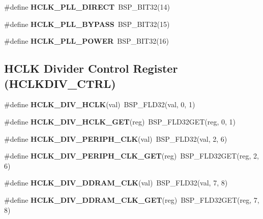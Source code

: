 \begin{DoxyCompactItemize}
\item 
\mbox{\label{group__lpc32xx__reg_ga9043291ff994770a7117844a3f10c4bd}} 
\#define {\bfseries H\+C\+L\+K\+\_\+\+P\+L\+L\+\_\+\+D\+I\+R\+E\+CT}~B\+S\+P\+\_\+\+B\+I\+T32(14)
\item 
\mbox{\label{group__lpc32xx__reg_ga78651bfed9ef9b15358fd20efc82333a}} 
\#define {\bfseries H\+C\+L\+K\+\_\+\+P\+L\+L\+\_\+\+B\+Y\+P\+A\+SS}~B\+S\+P\+\_\+\+B\+I\+T32(15)
\item 
\mbox{\label{group__lpc32xx__reg_ga4a435fd9889c1ff93fb42298be54f580}} 
\#define {\bfseries H\+C\+L\+K\+\_\+\+P\+L\+L\+\_\+\+P\+O\+W\+ER}~B\+S\+P\+\_\+\+B\+I\+T32(16)
\end{DoxyCompactItemize}
\subsection*{H\+C\+LK Divider Control Register (H\+C\+L\+K\+D\+I\+V\+\_\+\+C\+T\+RL)}
\begin{DoxyCompactItemize}
\item 
\mbox{\label{group__lpc32xx__reg_ga46664eafe2035b3fb7b5f1f2f5572d5d}} 
\#define {\bfseries H\+C\+L\+K\+\_\+\+D\+I\+V\+\_\+\+H\+C\+LK}(val)~B\+S\+P\+\_\+\+F\+L\+D32(val, 0, 1)
\item 
\mbox{\label{group__lpc32xx__reg_ga05d09aed63751579135d7867ff97c50e}} 
\#define {\bfseries H\+C\+L\+K\+\_\+\+D\+I\+V\+\_\+\+H\+C\+L\+K\+\_\+\+G\+ET}(reg)~B\+S\+P\+\_\+\+F\+L\+D32\+G\+ET(reg, 0, 1)
\item 
\mbox{\label{group__lpc32xx__reg_ga32adeca781c7517aa76b921f6535f8b9}} 
\#define {\bfseries H\+C\+L\+K\+\_\+\+D\+I\+V\+\_\+\+P\+E\+R\+I\+P\+H\+\_\+\+C\+LK}(val)~B\+S\+P\+\_\+\+F\+L\+D32(val, 2, 6)
\item 
\mbox{\label{group__lpc32xx__reg_ga6b121ac79fa5ecce65eda2a915e5808c}} 
\#define {\bfseries H\+C\+L\+K\+\_\+\+D\+I\+V\+\_\+\+P\+E\+R\+I\+P\+H\+\_\+\+C\+L\+K\+\_\+\+G\+ET}(reg)~B\+S\+P\+\_\+\+F\+L\+D32\+G\+ET(reg, 2, 6)
\item 
\mbox{\label{group__lpc32xx__reg_ga5f32ef0f2bc7083983e90e8fb4e48bcc}} 
\#define {\bfseries H\+C\+L\+K\+\_\+\+D\+I\+V\+\_\+\+D\+D\+R\+A\+M\+\_\+\+C\+LK}(val)~B\+S\+P\+\_\+\+F\+L\+D32(val, 7, 8)
\item 
\mbox{\label{group__lpc32xx__reg_gac780adda2eb14fa1f78606db5204793c}} 
\#define {\bfseries H\+C\+L\+K\+\_\+\+D\+I\+V\+\_\+\+D\+D\+R\+A\+M\+\_\+\+C\+L\+K\+\_\+\+G\+ET}(reg)~B\+S\+P\+\_\+\+F\+L\+D32\+G\+ET(reg, 7, 8)
\end{DoxyCompactItemize}
